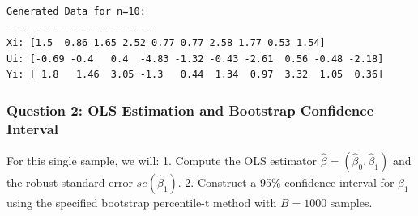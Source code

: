 \documentclass[11pt]{article}
\begin{document}
    \begin{Verbatim}[commandchars=\\\{\}]
Generated Data for n=10:
-------------------------
Xi: [1.5  0.86 1.65 2.52 0.77 0.77 2.58 1.77 0.53 1.54]
Ui: [-0.69 -0.4   0.4  -4.83 -1.32 -0.43 -2.61  0.56 -0.48 -2.18]
Yi: [ 1.8   1.46  3.05 -1.3   0.44  1.34  0.97  3.32  1.05  0.36]
    \end{Verbatim}

    \subsubsection{Question 2: OLS Estimation and Bootstrap Confidence
Interval}\label{question-2-ols-estimation-and-bootstrap-confidence-interval}

For this single sample, we will: 1. Compute the OLS estimator
\(\hat{\beta} = (\hat{\beta}_0, \hat{\beta}_1)\) and the robust standard
error \(se(\hat{\beta}_1)\). 2. Construct a 95\% confidence interval for
\(\beta_1\) using the specified bootstrap percentile-t method with
\(B=1000\) samples.
\end{document}
